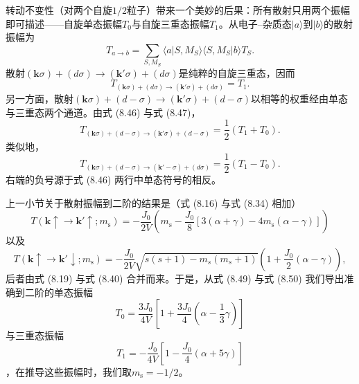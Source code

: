 转动不变性（对两个自旋$1/2$粒子）带来一个美妙的后果：所有散射只用两个振幅即可描述——自旋单态振幅$T_0$与自旋三重态振幅$T_1$。从电子–杂质态$|a\rangle$到$|b\rangle$的散射振幅为
\begin{equation*}
T_{a\to b} = \sum_{S,M_S}\langle a|S,M_S\rangle\langle S,M_S|b\rangle T_S.
\tag{8.47}
\end{equation*}
散射$(\mathbf{k}\sigma)+(d\sigma)\to(\mathbf{k}'\sigma)+(d\sigma)$是纯粹的自旋三重态，因而
\begin{equation*}
T_{(\mathbf{k}\sigma)+(d\sigma)\to(\mathbf{k}'\sigma)+(d\sigma)} = T_1.
\tag{8.48}
\end{equation*}
另一方面，散射$(\mathbf{k}\sigma)+(d-\sigma)\to(\mathbf{k}'\sigma)+(d-\sigma)$以相等的权重经由单态与三重态两个通道。由式 (8.46) 与式 (8.47)，
\begin{equation*}
T_{(\mathbf{k}\sigma)+(d-\sigma)\to(\mathbf{k}'\sigma)+(d-\sigma)} = \frac{1}{2}(T_1+T_0).
\tag{8.49}
\end{equation*}
类似地，
\begin{equation*}
T_{(\mathbf{k}\sigma)+(d-\sigma)\to(\mathbf{k}'-\sigma)+(d\sigma)} = \frac{1}{2}(T_1-T_0).
\tag{8.50}
\end{equation*}
右端的负号源于式 (8.46) 两行中单态符号的相反。

上一小节关于散射振幅到二阶的结果是（式 (8.16) 与式 (8.34) 相加）
\begin{equation*}
T(\mathbf{k}\uparrow\to\mathbf{k}'\uparrow;m_{\mathrm{s}}) = -\frac{J_0}{2V}\left(m_{\mathrm{s}}-\frac{J_0}{8}\left[3(\alpha+\gamma)-4m_{\mathrm{s}}(\alpha-\gamma)\right]\right)
\tag{8.51}
\end{equation*}
以及
\begin{equation*}
T(\mathbf{k}\uparrow\to\mathbf{k}'\downarrow;m_{\mathrm{s}}) = -\frac{J_0}{2V}\sqrt{s(s+1)-m_s(m_s+1)}\left(1+\frac{J_0}{2}(\alpha-\gamma)\right),
\tag{8.52}
\end{equation*}
后者由式 (8.19) 与式 (8.40) 合并而来。于是，从式 (8.49) 与式 (8.50) 我们导出准确到二阶的单态振幅
\begin{equation*}
T_0 = \frac{3J_0}{4V}\left[1+\frac{3J_0}{4}\left(\alpha-\frac{1}{3}\gamma\right)\right]
\tag{8.53}
\end{equation*}
与三重态振幅
\begin{equation*}
T_1 = -\frac{J_0}{4V}\left[1-\frac{J_0}{4}(\alpha+5\gamma)\right]
\tag{8.54}
\end{equation*}
，在推导这些振幅时，我们取$m_{\mathrm{s}}=-1/2$。

